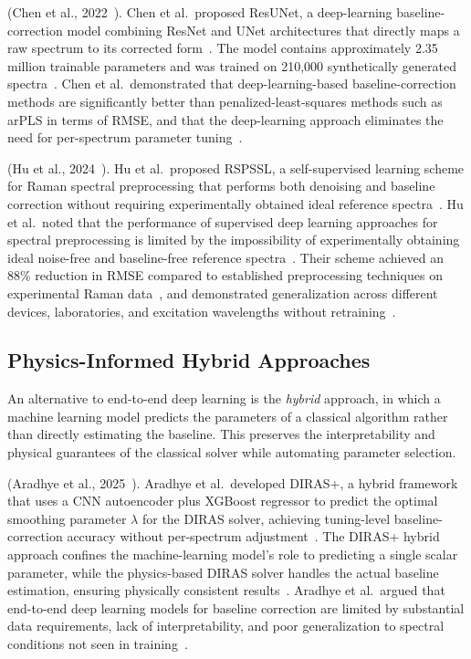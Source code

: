  (Chen et al., 2022~\cite{chen2022resunet}). Chen et al.\ proposed ResUNet, a deep-learning baseline-correction model combining ResNet and UNet architectures that directly maps a raw spectrum to its corrected form~\cite{chen2022resunet}. The model contains approximately 2.35 million trainable parameters and was trained on 210,000 synthetically generated spectra~\cite{chen2022resunet}. Chen et al.\ demonstrated that deep-learning-based baseline-correction methods are significantly better than penalized-least-squares methods such as arPLS in terms of RMSE, and that the deep-learning approach eliminates the need for per-spectrum parameter tuning~\cite{chen2022resunet}.

 (Hu et al., 2024~\cite{hu2024rspssl}). Hu et al.\ proposed RSPSSL, a self-supervised learning scheme for Raman spectral preprocessing that performs both denoising and baseline correction without requiring experimentally obtained ideal reference spectra~\cite{hu2024rspssl}. Hu et al.\ noted that the performance of supervised deep learning approaches for spectral preprocessing is limited by the impossibility of experimentally obtaining ideal noise-free and baseline-free reference spectra~\cite{hu2024rspssl}. Their scheme achieved an 88\% reduction in RMSE compared to established preprocessing techniques on experimental Raman data~\cite{hu2024rspssl}, and demonstrated generalization across different devices, laboratories, and excitation wavelengths without retraining~\cite{hu2024rspssl}.

\subsection{Physics-Informed Hybrid Approaches}
\label{sec:bg_neural_hybrid}

An alternative to end-to-end deep learning is the \emph{hybrid} approach, in which a machine learning model predicts the parameters of a classical algorithm rather than directly estimating the baseline. This preserves the interpretability and physical guarantees of the classical solver while automating parameter selection.

 (Aradhye et al., 2025~\cite{aradhye2025diras}). Aradhye et al.\ developed DIRAS+, a hybrid framework that uses a CNN autoencoder plus XGBoost regressor to predict the optimal smoothing parameter $\lambda$ for the DIRAS solver, achieving tuning-level baseline-correction accuracy without per-spectrum adjustment~\cite{aradhye2025diras}. The DIRAS+ hybrid approach confines the machine-learning model's role to predicting a single scalar parameter, while the physics-based DIRAS solver handles the actual baseline estimation, ensuring physically consistent results~\cite{aradhye2025diras}. Aradhye et al.\ argued that end-to-end deep learning models for baseline correction are limited by substantial data requirements, lack of interpretability, and poor generalization to spectral conditions not seen in training~\cite{aradhye2025diras}.

